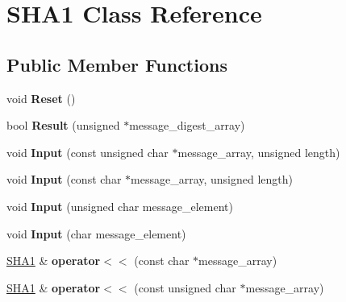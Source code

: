 \hypertarget{class_s_h_a1}{\section{S\-H\-A1 Class Reference}
\label{class_s_h_a1}
}
\subsection*{Public Member Functions}
\begin{DoxyCompactItemize}
\item 
\hypertarget{class_s_h_a1_accec3092d91c84d7e71d32c681357119}{void {\bfseries Reset} ()}\label{class_s_h_a1_accec3092d91c84d7e71d32c681357119}

\item 
\hypertarget{class_s_h_a1_ab374ecf64d54cc133805322370f3b0f1}{bool {\bfseries Result} (unsigned $\ast$message\-\_\-digest\-\_\-array)}\label{class_s_h_a1_ab374ecf64d54cc133805322370f3b0f1}

\item 
\hypertarget{class_s_h_a1_a5612d5feb8202a4930aa271df8cbf102}{void {\bfseries Input} (const unsigned char $\ast$message\-\_\-array, unsigned length)}\label{class_s_h_a1_a5612d5feb8202a4930aa271df8cbf102}

\item 
\hypertarget{class_s_h_a1_a0c7555ddc781f3834c0a6218d1edc98e}{void {\bfseries Input} (const char $\ast$message\-\_\-array, unsigned length)}\label{class_s_h_a1_a0c7555ddc781f3834c0a6218d1edc98e}

\item 
\hypertarget{class_s_h_a1_af4d21901eb9ed48d8f8a16d0ec166829}{void {\bfseries Input} (unsigned char message\-\_\-element)}\label{class_s_h_a1_af4d21901eb9ed48d8f8a16d0ec166829}

\item 
\hypertarget{class_s_h_a1_a0fb5a35d1bc54e568d8774f966441c41}{void {\bfseries Input} (char message\-\_\-element)}\label{class_s_h_a1_a0fb5a35d1bc54e568d8774f966441c41}

\item 
\hypertarget{class_s_h_a1_a5d334b9a7847596c51e671ae8fded37b}{\hyperlink{class_s_h_a1}{S\-H\-A1} \& {\bfseries operator$<$$<$} (const char $\ast$message\-\_\-array)}\label{class_s_h_a1_a5d334b9a7847596c51e671ae8fded37b}

\item 
\hypertarget{class_s_h_a1_a4debec5cf6b08eb019c5fddb2f2ec68f}{\hyperlink{class_s_h_a1}{S\-H\-A1} \& {\bfseries operator$<$$<$} (const unsigned char $\ast$message\-\_\-array)}\label{class_s_h_a1_a4debec5cf6b08eb019c5fddb2f2ec68f}


\end{DoxyCompactItemize}
